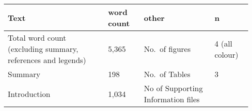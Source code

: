 \documentclass[
]{article}
\begin{document}
\begin{longtable}[]{@{}llll@{}}
\toprule
\begin{minipage}[b]{0.35\columnwidth}\raggedright
Text\strut
\end{minipage} & \begin{minipage}[b]{0.16\columnwidth}\raggedright
word count\strut
\end{minipage} & \begin{minipage}[b]{0.22\columnwidth}\raggedright
other\strut
\end{minipage} & \begin{minipage}[b]{0.15\columnwidth}\raggedright
n\strut
\end{minipage}\tabularnewline
\midrule
\endhead
\begin{minipage}[t]{0.35\columnwidth}\raggedright
Total word count (excluding summary, references and legends)\strut
\end{minipage} & \begin{minipage}[t]{0.16\columnwidth}\raggedright
5,365\strut
\end{minipage} & \begin{minipage}[t]{0.22\columnwidth}\raggedright
No.~of figures\strut
\end{minipage} & \begin{minipage}[t]{0.15\columnwidth}\raggedright
4 (all colour)\strut
\end{minipage}\tabularnewline
\begin{minipage}[t]{0.35\columnwidth}\raggedright
Summary\strut
\end{minipage} & \begin{minipage}[t]{0.16\columnwidth}\raggedright
198\strut
\end{minipage} & \begin{minipage}[t]{0.22\columnwidth}\raggedright
No.~of Tables\strut
\end{minipage} & \begin{minipage}[t]{0.15\columnwidth}\raggedright
3\strut
\end{minipage}\tabularnewline
\begin{minipage}[t]{0.35\columnwidth}\raggedright
Introduction\strut
\end{minipage} & \begin{minipage}[t]{0.16\columnwidth}\raggedright
1,034\strut
\end{minipage} & \begin{minipage}[t]{0.22\columnwidth}\raggedright
No of Supporting Information files\strut
\end{minipage} & \begin{minipage}[t]{0.15\columnwidth}\raggedright

\end{minipage}
\end{longtable}
\end{document}
